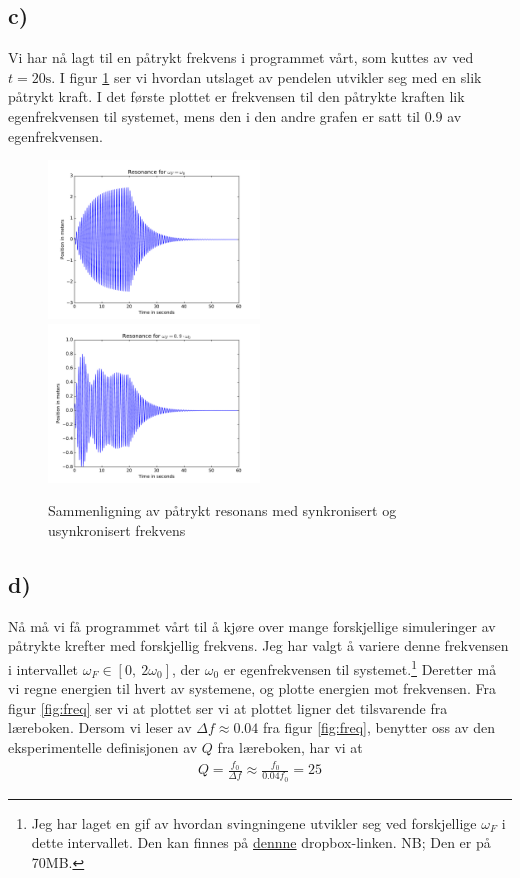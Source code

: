 \documentclass[12p,a4paper]{article}
\begin{document}
\subsection*{c)}
Vi har nå lagt til en påtrykt frekvens i programmet vårt, som kuttes av ved $t = 20\mathrm{s}$. I figur \ref{fig:resonans} ser vi hvordan utslaget av pendelen utvikler seg med en slik påtrykt kraft. I det første plottet er frekvensen til den påtrykte kraften lik egenfrekvensen til systemet, mens den i den andre grafen er satt til $0.9$ av egenfrekvensen.
\begin{figure}[H]
\includegraphics[width=0.5\textwidth]{fig/ResonanceSynced.pdf}
\includegraphics[width=0.5\textwidth]{fig/ResonanceUnsynced.pdf}
\caption{Sammenligning av påtrykt resonans med synkronisert og usynkronisert frekvens}
\label{fig:resonans}
\end{figure}



\subsection*{d)}
Nå må vi få programmet vårt til å kjøre over mange forskjellige simuleringer av påtrykte krefter med forskjellig frekvens. Jeg har valgt å variere denne frekvensen i intervallet $\omega_F \in [0, \ 2\omega_0]$, der $\omega_0$ er egenfrekvensen til systemet.\footnote{Jeg har laget en gif av hvordan svingningene utvikler seg ved forskjellige $\omega_F$ i dette intervallet. Den kan finnes på \href{https://www.dropbox.com/s/dwi7ei6tii6a9q9/Frequencies.gif?dl=0}{dennne} dropbox-linken. NB; Den er på 70MB.} Deretter må vi regne energien til hvert av systemene, og plotte energien mot frekvensen. Fra figur \ref{fig:freq} ser vi at plottet ser vi at plottet ligner det tilsvarende fra læreboken. Dersom vi leser av $\Delta f \approx 0.04$ fra figur \ref{fig:freq}, benytter oss av den eksperimentelle definisjonen av $Q$ fra læreboken, har vi at
\begin{align*}
Q = \frac{f_0}{\Delta f} \approx \frac{f_0}{0.04f_0} = 25
\end{align*}
 
\end{document}
